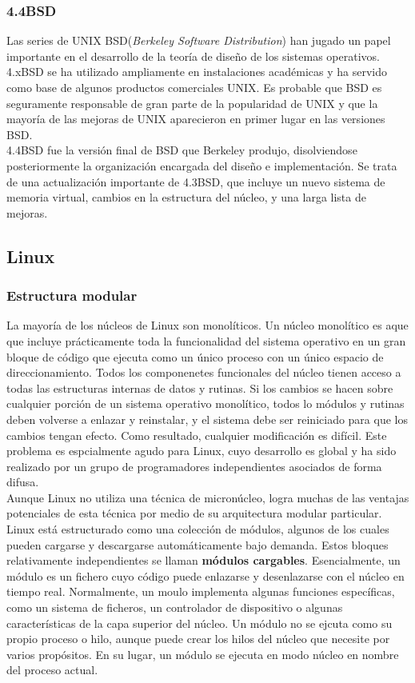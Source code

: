 \documentclass{article}
\begin{document}
			\subsubsection{4.4BSD}
				Las series de UNIX BSD(\textit{Berkeley Software Distribution}) han jugado un papel importante en el desarrollo de la teoría de diseño de los sistemas operativos. 4.xBSD se ha utilizado ampliamente en instalaciones académicas y ha servido como base de algunos productos comerciales UNIX. Es probable que BSD es seguramente responsable de gran parte de la popularidad de UNIX y que la mayoría de las mejoras de UNIX aparecieron en primer lugar en las versiones BSD. \\
				
				4.4BSD fue la versión final de BSD que Berkeley produjo, disolviendose posteriormente la organización encargada del diseño e implementación. Se trata de una actualización importante de 4.3BSD, que incluye un nuevo sistema de memoria virtual, cambios en la estructura del núcleo, y una larga lista de mejoras.
				
		\subsection{Linux}
			\subsubsection{Estructura modular}
				La mayoría de los núcleos de Linux son monolíticos. Un núcleo monolítico es aque que incluye prácticamente toda la funcionalidad del sistema operativo en un gran bloque de código que ejecuta como un único proceso con un único espacio de direccionamiento. Todos los componenetes funcionales del núcleo tienen acceso a todas las estructuras internas de datos y rutinas. Si los cambios se hacen sobre cualquier porción de un sistema operativo monolítico, todos lo módulos y rutinas deben volverse a enlazar y reinstalar, y el sistema debe ser reiniciado para que los cambios tengan efecto. Como resultado, cualquier modificación es difícil. Este problema es espcialmente agudo para Linux, cuyo desarrollo es global y ha sido realizado por un grupo de programadores independientes asociados de forma difusa. \\
				
				Aunque Linux no utiliza una técnica de micronúcleo, logra muchas de las ventajas potenciales de esta técnica por medio de su arquitectura modular particular. Linux está estructurado como una colección de módulos, algunos de los cuales pueden cargarse y descargarse automáticamente bajo demanda. Estos bloques relativamente independientes se llaman \textbf{módulos cargables}. Esencialmente, un módulo es un fichero cuyo código puede enlazarse y desenlazarse con el núcleo en tiempo real. Normalmente, un moulo implementa algunas funciones específicas, como un sistema de ficheros, un controlador de dispositivo o algunas características de la capa superior del núcleo. Un módulo no se ejcuta como su propio proceso o hilo, aunque puede crear los hilos del núcleo que necesite por varios propósitos. En su lugar, un módulo se ejecuta en modo núcleo en nombre del proceso actual. \\
				
\end{document}
